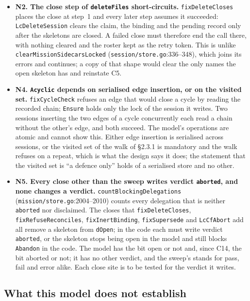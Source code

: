 \documentclass[a4paper,10pt,fleqn]{article}
\newcommand{\fpath}[1]{\texttt{#1}}
\newcommand{\field}[1]{\texttt{#1}}
\begin{document}
\begin{itemize}
  \item \textbf{N2. The close step of \field{deleteFiles} short-circuits.}
    \field{fixDeleteCloses} places the close at step~1 and every later step
    assumes it succeeded: \field{LcDeleteSession} clears the claim, the
    binding and the pending record only after the skeletons are closed. A
    failed close must therefore end the call there, with nothing cleared and
    the roster kept as the retry token. This is unlike
    \field{clearMissionSidecarsLocked} (\fpath{session/store.go}:336--348),
    which joins its errors and continues; a copy of that shape would clear
    the only names the open skeleton has and reinstate C5.
  \item \textbf{N4. \field{Acyclic} depends on serialised edge insertion, or
    on the visited set.} \field{fixCycleCheck} refuses an edge that would
    close a cycle by reading the recorded chain; \field{Ensure} holds only
    the lock of the session it writes. Two sessions inserting the two edges
    of a cycle concurrently each read a chain without the other's edge, and
    both succeed. The model's operations are atomic and cannot show this.
    Either edge insertion is serialised across sessions, or the visited set
    of the walk of \S2.3.1 is mandatory and the walk refuses on a repeat,
    which is what the design says it does; the statement that the visited
    set is ``a defence only'' holds of a serialised store and no other.
  \item \textbf{N5. Every close other than the sweep writes verdict
    \field{aborted}, and none changes a verdict.} \field{countBlockingDelegations}
    (\fpath{mission/store.go}:2004--2010) counts every delegation that is
    neither \field{aborted} nor disclaimed. The closes that
    \field{fixDeleteCloses}, \field{fixRefuseReconciles},
    \field{fixInertBinding}, \field{fixSupersede} and \field{LcCfAbort} add
    all remove a skeleton from \field{dOpen}; in the code each must write
    verdict \field{aborted}, or the skeleton stops being open in the model
    and still blocks \field{Abandon} in the code. The model has the bit
    open or not and, since C14, the bit aborted or not; it has no other
    verdict, and the sweep's stands for pass, fail and error alike. Each
    close site is to be tested for the verdict it writes.
\end{itemize}

\subsection{What this model does not establish}
\label{sec:lc-limits}
\end{document}
